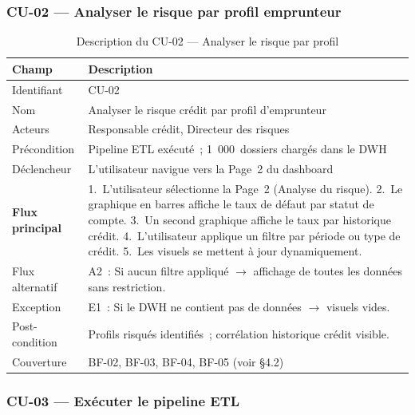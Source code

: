 \documentclass[12pt, a4paper]{report}
\begin{document}
\subsubsection{CU-02 --- Analyser le risque par profil emprunteur}

\begin{table}[H]
\centering
\caption{Description du CU-02 --- Analyser le risque par profil}
\label{tab:cu02}
\renewcommand{\arraystretch}{1.3}
\begin{tabularx}{\textwidth}{p{3.5cm} X}
\toprule
\rowcolor{primary!12}
Champ & Description \\
\midrule
Identifiant      & CU-02 \\
Nom              & Analyser le risque crédit par profil d'emprunteur \\
Acteurs          & Responsable crédit, Directeur des risques \\
Précondition     & Pipeline ETL exécuté~; 1~000~dossiers chargés dans le DWH \\
Déclencheur      & L'utilisateur navigue vers la Page~2 du dashboard \\
\textbf{Flux principal} & 1.~L'utilisateur sélectionne la Page~2 (Analyse du risque). 2.~Le graphique en barres affiche le taux de défaut par statut de compte. 3.~Un second graphique affiche le taux par historique crédit. 4.~L'utilisateur applique un filtre par période ou type de crédit. 5.~Les visuels se mettent à jour dynamiquement. \\
Flux alternatif  & A2~: Si aucun filtre appliqué $\to$ affichage de toutes les données sans restriction. \\
Exception        & E1~: Si le DWH ne contient pas de données $\to$ visuels vides. \\
Post-condition   & Profils risqués identifiés~; corrélation historique crédit visible. \\
Couverture       & BF-02, BF-03, BF-04, BF-05 (voir §4.2) \\
\bottomrule
\end{tabularx}
\end{table}

\subsubsection{CU-03 --- Exécuter le pipeline ETL}
\end{document}
